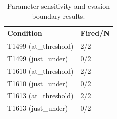 \begin{table}[t]
\centering
\caption{Parameter sensitivity and evasion boundary results.}
\label{tab:param-sensitivity}
\begin{tabular}{ll}
\toprule
Condition & Fired/N \\
\midrule
T1499 (at_threshold) & 2/2 \\
T1499 (just_under) & 0/2 \\
T1610 (at_threshold) & 2/2 \\
T1610 (just_under) & 0/2 \\
T1613 (at_threshold) & 2/2 \\
T1613 (just_under) & 0/2 \\
\bottomrule
\end{tabular}
\end{table}
